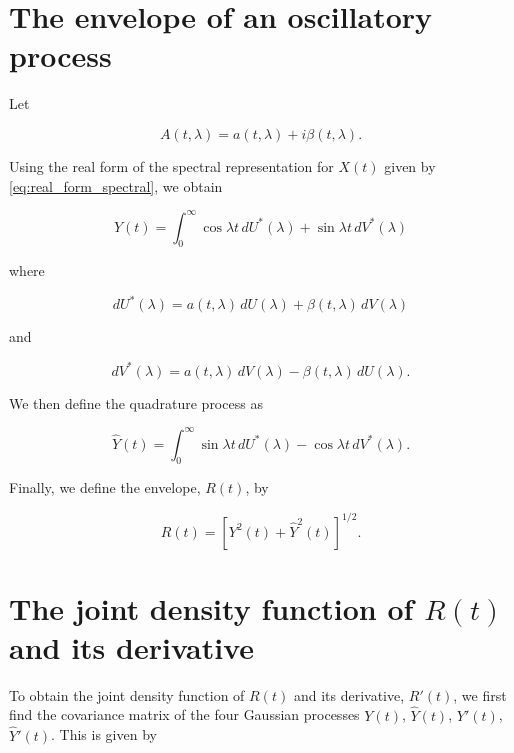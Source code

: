 \documentclass{article}
\begin{document}
\section{The envelope of an oscillatory process}
Let

\begin{equation}
\label{eq:complex_a}
A(t, \lambda) = a(t, \lambda) + i\beta(t, \lambda).
\end{equation}

Using the real form of the spectral representation for $X(t)$ given by \ref{eq:real_form_spectral}, we obtain

\begin{equation}
\label{eq:real_form_y}
Y(t) = \int_0^{\infty} \cos \lambda t \, dU^*(\lambda) + \sin \lambda t \, dV^*(\lambda)
\end{equation}

where

\begin{equation}
\label{eq:du_star}
dU^*(\lambda) = a(t, \lambda) \, dU(\lambda) + \beta(t, \lambda) \, dV(\lambda)
\end{equation}

and

\begin{equation}
\label{eq:dv_star}
dV^*(\lambda) = a(t, \lambda) \, dV(\lambda) - \beta(t, \lambda) \, dU(\lambda).
\end{equation}

We then define the quadrature process as

\begin{equation}
\label{eq:quadrature_y}
\hat{Y}(t) = \int_0^{\infty} \sin \lambda t \, dU^*(\lambda) - \cos \lambda t \, dV^*(\lambda).
\end{equation}

Finally, we define the envelope, $R(t)$, by

\begin{equation}
\label{eq:envelope_r}
R(t) = [Y^2(t) + \hat{Y}^2(t)]^{1/2}.
\end{equation}

\section{The joint density function of $R(t)$ and its derivative}
To obtain the joint density function of $R(t)$ and its derivative, $R'(t)$, we first find the covariance matrix of the four Gaussian processes $Y(t)$, $\hat{Y}(t)$, $Y'(t)$, $\hat{Y}'(t)$. This is given by
\end{document}
